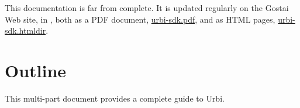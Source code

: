 This documentation is far from complete.  It is updated regularly on
the Gostai Web site, in \href{\docurl}{\docurl}, both as a PDF
document, \href{\docurl/urbi-sdk.pdf}{urbi-sdk.pdf}, and as HTML
pages, \href{\docurl/urbi-sdk.htmldir}{urbi-sdk.htmldir}.


\section{Outline}

This multi-part document provides a complete guide to Urbi.

\newenvironment{partDescription}[2]
{%
  \item[\autoref{#1} --- \nameref{#1}]~\\%
  #2
  \begin{description}%
    \let\itemOrig\item%
    \renewcommand{\item}[1][]{\itemOrig[~~\autoref{##1} --- \nameref{##1}]~\\}%
  }{%
  \end{description}%
}

